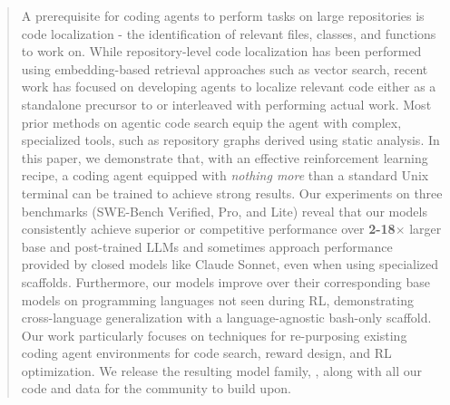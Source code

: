\begin{abstract}
A prerequisite for coding agents to perform tasks on large repositories is code localization - the identification of relevant files, classes, and functions to work on. 
While repository-level code localization has been performed using embedding-based retrieval approaches such as vector search, recent work has focused on developing agents to localize relevant code either as a standalone precursor to or interleaved with performing actual work.
Most prior methods on agentic code search equip the agent with complex, specialized tools, such as repository graphs derived using static analysis.
In this paper, we demonstrate that, with an effective reinforcement learning recipe, a coding agent equipped with \emph{nothing more} than a standard Unix terminal can be trained to achieve strong results. Our experiments on three benchmarks (SWE-Bench Verified, Pro, and Lite) reveal that our models consistently achieve superior or competitive performance over \textbf{2-18$\times$} larger base and post-trained LLMs and sometimes approach performance provided by closed models like Claude Sonnet, even when using specialized scaffolds. Furthermore, our models improve over their corresponding base models on programming languages not seen during RL, demonstrating cross-language generalization with a language-agnostic bash-only scaffold.
Our work particularly focuses on techniques for re-purposing existing coding agent environments for code search, reward design, and RL optimization. We release the resulting model family, \methodname, along with all our code and data for the community to build upon.
\end{abstract}
